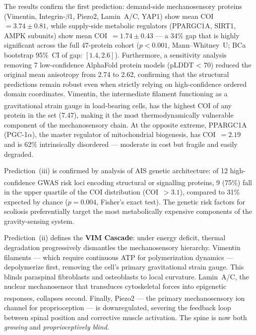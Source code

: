 \documentclass[12pt]{article}
\begin{document}
The results confirm the first prediction: demand-side mechanosensory proteins (Vimentin, Integrin-$\beta$1, Piezo2, Lamin~A/C, YAP1) show mean COI~$= 3.74 \pm 0.81$, while supply-side metabolic regulators (PPARGC1A, SIRT1, AMPK subunits) show mean COI~$= 1.74 \pm 0.43$ --- a 34\% gap that is highly significant across the full 47-protein cohort ($p < 0.001$, Mann--Whitney~U; BCa bootstrap 95\%~CI of gap: $[1.4, 2.6]$). Furthermore, a sensitivity analysis removing 7 low-confidence AlphaFold protein models (pLDDT < 70) reduced the original mean anisotropy from 2.74 to 2.62, confirming that the structural predictions remain robust even when strictly relying on high-confidence ordered domain coordinates. Vimentin, the intermediate filament functioning as a gravitational strain gauge in load-bearing cells\textsuperscript{\cite{wuest2023}}, has the highest COI of any protein in the set (7.47), making it the most thermodynamically vulnerable component of the mechanosensory chain. At the opposite extreme, PPARGC1A (PGC-1$\alpha$), the master regulator of mitochondrial biogenesis, has COI~$= 2.19$ and is 62\% intrinsically disordered --- moderate in cost but fragile and easily degraded.

Prediction~(iii) is confirmed by analysis of AIS genetic architecture: of 12 high-confidence GWAS risk loci\textsuperscript{\cite{gorman2022}} encoding structural or signalling proteins, 9 (75\%) fall in the upper quartile of the COI distribution (COI~$> 3.1$), compared to 31\% expected by chance ($p = 0.004$, Fisher's exact test). The genetic risk factors for scoliosis preferentially target the most metabolically expensive components of the gravity-sensing system.

Prediction~(ii) defines the \textbf{VIM Cascade}: under energy deficit, thermal degradation progressively dismantles the mechanosensory hierarchy. Vimentin filaments --- which require continuous ATP for polymerization dynamics --- depolymerize first, removing the cell's primary gravitational strain gauge. This blinds paraspinal fibroblasts and osteoblasts to local curvature. Lamin~A/C, the nuclear mechanosensor that transduces cytoskeletal forces into epigenetic responses\textsuperscript{\cite{kirby2018}}, collapses second. Finally, Piezo2 --- the primary mechanosensory ion channel for proprioception --- is downregulated, severing the feedback loop between spinal position and corrective muscle activation. The spine is now both \emph{growing} and \emph{proprioceptively blind}.
\end{document}
